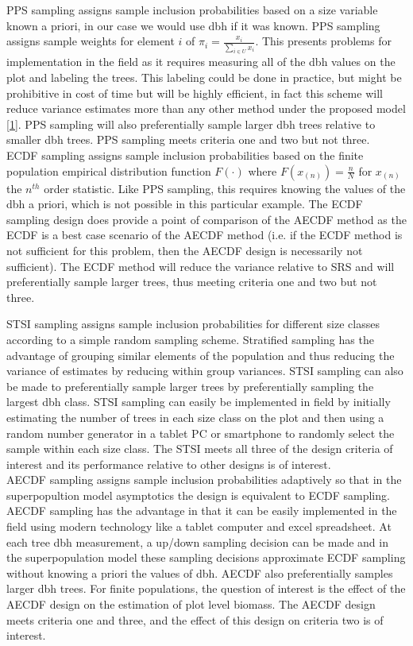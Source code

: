 \documentclass{beamer}
\begin{document}
\begin{frame}
  PPS sampling assigns sample inclusion probabilities based on a size variable known a priori, in our case we would use dbh if it was known. PPS sampling assigns sample weights for element $i$ of $\pi_i = \frac{x_i} {\sum_{i \in U} x_i}$. This presents problems for implementation in the field as it requires measuring all of the dbh values on the plot and labeling the trees. This labeling could be done in practice, but might be prohibitive in cost of time but will be highly efficient, in fact this scheme will reduce variance estimates more than any other method under the proposed model \eqref{1}. PPS sampling will also preferentially sample larger dbh trees relative to smaller dbh trees. PPS sampling meets criteria one and two but not three.\\
  ECDF sampling assigns sample inclusion probabilities based on the finite population empirical distribution function $F(\cdot)$ where $F(x_{(n)}) = \frac{n} {N}$ for $x_{(n)}$ the $n^{th}$ order statistic. Like PPS sampling, this requires knowing the values of the dbh a priori, which is not possible in this particular example. The ECDF sampling design does provide a point of comparison of the AECDF method as the ECDF is a best case scenario of the AECDF method (i.e. if the ECDF method is not sufficient for this problem, then the AECDF design is necessarily not sufficient). The ECDF method will reduce the variance relative to SRS and will preferentially sample larger trees, thus meeting criteria one and two but not three.
\end{frame}
%
\begin{frame}
  STSI sampling assigns sample inclusion probabilities for different size classes according to a simple random sampling scheme. Stratified sampling has the advantage of grouping similar elements of the population and thus reducing the variance of estimates by reducing within group variances. STSI sampling can also be made to preferentially sample larger trees by preferentially sampling the largest dbh class. STSI sampling can easily be implemented in field by initially estimating the number of trees in each size class on the plot and then using a random number generator in a tablet PC or smartphone to randomly select the sample within each size class. The STSI meets all three of the design criteria of interest and its performance relative to other designs is of interest.\\
  AECDF sampling assigns sample inclusion probabilities adaptively so that in the superpopultion model asymptotics the design is equivalent to ECDF sampling. AECDF sampling has the advantage in that it can be easily implemented in the field using modern technology like a tablet computer and excel spreadsheet. At each tree dbh measurement, a up/down sampling decision can be made and in the superpopulation model these sampling decisions approximate ECDF sampling without knowing a priori the values of dbh. AECDF also preferentially samples larger dbh trees. For finite populations, the question of interest is the effect of the AECDF design on the estimation of plot level biomass. The AECDF design meets criteria one and three, and the effect of this design on criteria two is of interest.
\end{frame}
\end{document}
